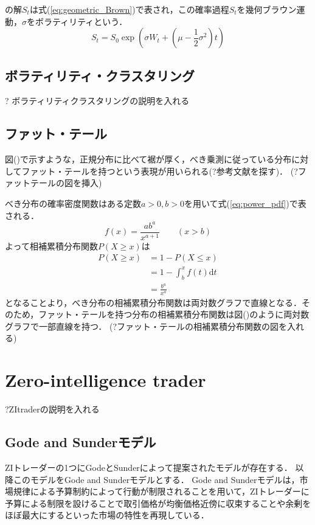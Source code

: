 \documentclass[titlepage]{jsreport}
\begin{document}
の解$S_t$は式(\ref{eq:geometric_Brown})で表され，この確率過程$S_t$を幾何ブラウン運動，$\sigma$をボラティリティという\cite{Stochastic_Calculus}．
\begin{equation}
    S_t = S_0 \exp{\left(\sigma W_t + \left( \mu - \frac{1}{2}\sigma^2 \right)t\right)} \label{eq:geometric_Brown}
\end{equation}

\subsection{ボラティリティ・クラスタリング}
? ボラティリティクラスタリングの説明を入れる

\subsection{ファット・テール}
図()で示すような，正規分布に比べて裾が厚く，べき乗測に従っている分布に対してファット・テールを持つという表現が用いられる(?参考文献を探す)．
(?ファットテールの図を挿入)

べき分布の確率密度関数はある定数$a > 0,b > 0$を用いて式(\ref{eq:power_pdf})で表される\cite{PowerDistribution}．
\begin{equation}
    f(x) = \frac{ab^a}{x^{a + 1}} \qquad (x > b) \label{eq:power_pdf}
\end{equation}
よって相補累積分布関数$P(X \geq x)$は
\begin{equation}
    \begin{aligned}
        P(X \geq x) & = 1 - P(X \leq x)                     \\
                    & = 1 - \int_{b}^{x} f(t) \mathrm{d}t   \\
                    & = \frac{b^a}{x^a} \label{eq:survival}
    \end{aligned}
\end{equation}
となることより，べき分布の相補累積分布関数は両対数グラフで直線となる．そのため，ファット・テールを持つ分布の相補累積分布関数は図()のように両対数グラフで一部直線を持つ．
(?ファット・テールの相補累積分布関数の図を入れる)

\section{Zero-intelligence trader}
?ZItraderの説明を入れる

\subsection{Gode and Sunderモデル}
ZIトレーダーの1つにGodeとSunderによって提案されたモデルが存在する\cite{Gode_and_Sunder}．
以降このモデルをGode and Sunderモデルとする．
Gode and Sunderモデルは，市場規律による予算制約によって行動が制限されること\cite{market_displine}を用いて，ZIトレーダーに予算による制限を設けることで取引価格が均衡価格近傍に収束することや余剰をほぼ最大にするといった市場の特性を再現している．
\end{document}
